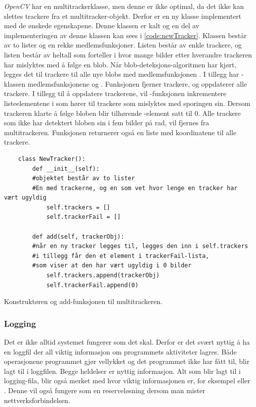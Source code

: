 \textit{OpenCV} har en multitrackerklasse, men denne er ikke optimal, da det ikke kan slettes trackere fra et multitracker-objekt. 
Derfor er en ny klasse implementert med de ønskede egenskapene. 
Denne klassen er kalt  og en del av implementeringen av denne klassen kan sees i \autoref{code:newTracker}. 
Klassen består av to lister og en rekke medlemsfunksjoner. 
Listen  består av enkle trackere, og listen  består av heltall som forteller i hvor mange bilder etter hverandre trackeren har mislyktes med å følge en blob. 
Når blob-deteksjons-algoritmen har kjørt, legges det til trackere til alle nye blobs med medlemsfunksjonen .
I tillegg har -klassen medlemsfunksjonene  og  \cite{GitHub}. 
Funksjonen  fjerner trackere, og  oppdaterer alle trackere. 
I tillegg til å oppdatere trackerene, vil -funksjonen inkrementere listeelementene i  som hører til trackere som mislyktes med sporingen sin.
Dersom trackeren klarte å følge bloben blir tilhørende -element satt til $0$. 
Alle trackere som ikke har detektert bloben sin i fem bilder på rad, vil fjernes fra multitrackeren. Funksjonen  returnerer også en liste med koordinatene til alle trackere.


\begin{listing}[!htb]
\begin{verbatim}
    class NewTracker():                     
        def __init__(self):
        #objektet består av to lister
        #En med trackerne, og en som vet hvor lenge en tracker har vært ugyldig
            self.trackers = []             
            self.trackerFail = []
    
        def add(self, trackerObj):
        #når en ny tracker legges til, legges den inn i self.trackers
        #i tillegg får den et element i trackerFail-lista,
        #som viser at den har vært ugyldig i 0 bilder
            self.trackers.append(trackerObj)
            self.trackerFail.append(0)
\end{verbatim}
\caption{Konstruktøren og add-funksjonen til multitrackeren.}
\label{code:newTracker}
\end{listing}


\subsubsection{Logging}\label{sec:impl:programvare:logging}
Det er ikke alltid systemet fungerer som det skal.
Derfor er det svært nyttig å ha en loggfil der all viktig informasjon om programmets aktiviteter lagres. 
Både operasjonene programmet gjør vellykket og det programmet ikke har fått til, blir lagt til i loggfilen. 
Begge heldelser er nyttig informasjon. 
Alt som blir lagt til i logging-fila, blir også merket med hvor viktig informasjonen er, for eksempel  eller . 
Denne vil også fungere som en reserveløsning dersom man mister nettverksforbindelsen.

